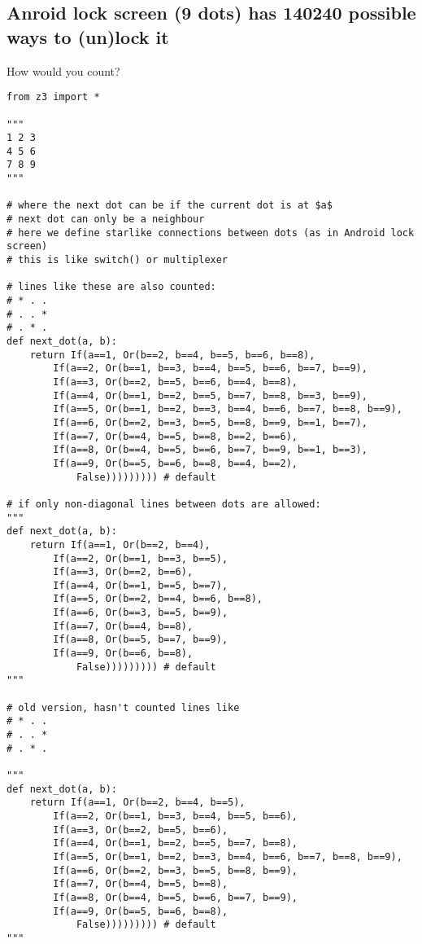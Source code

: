 \subsection{Anroid lock screen (9 dots) has 140240 possible ways to (un)lock it}

How would you count?

\begin{lstlisting}
from z3 import *

"""
1 2 3
4 5 6
7 8 9
"""

# where the next dot can be if the current dot is at $a$
# next dot can only be a neighbour
# here we define starlike connections between dots (as in Android lock screen)
# this is like switch() or multiplexer

# lines like these are also counted:
# * . .
# . . *
# . * .
def next_dot(a, b):
    return If(a==1, Or(b==2, b==4, b==5, b==6, b==8),
        If(a==2, Or(b==1, b==3, b==4, b==5, b==6, b==7, b==9),
        If(a==3, Or(b==2, b==5, b==6, b==4, b==8),
        If(a==4, Or(b==1, b==2, b==5, b==7, b==8, b==3, b==9),
        If(a==5, Or(b==1, b==2, b==3, b==4, b==6, b==7, b==8, b==9),
        If(a==6, Or(b==2, b==3, b==5, b==8, b==9, b==1, b==7),
        If(a==7, Or(b==4, b==5, b==8, b==2, b==6),
        If(a==8, Or(b==4, b==5, b==6, b==7, b==9, b==1, b==3),
        If(a==9, Or(b==5, b==6, b==8, b==4, b==2),
            False))))))))) # default

# if only non-diagonal lines between dots are allowed:
"""
def next_dot(a, b):
    return If(a==1, Or(b==2, b==4),
        If(a==2, Or(b==1, b==3, b==5),
        If(a==3, Or(b==2, b==6),
        If(a==4, Or(b==1, b==5, b==7),
        If(a==5, Or(b==2, b==4, b==6, b==8),
        If(a==6, Or(b==3, b==5, b==9),
        If(a==7, Or(b==4, b==8),
        If(a==8, Or(b==5, b==7, b==9),
        If(a==9, Or(b==6, b==8),
            False))))))))) # default
"""

# old version, hasn't counted lines like
# * . .
# . . *
# . * .

"""
def next_dot(a, b):
    return If(a==1, Or(b==2, b==4, b==5),
        If(a==2, Or(b==1, b==3, b==4, b==5, b==6),
        If(a==3, Or(b==2, b==5, b==6),
        If(a==4, Or(b==1, b==2, b==5, b==7, b==8),
        If(a==5, Or(b==1, b==2, b==3, b==4, b==6, b==7, b==8, b==9),
        If(a==6, Or(b==2, b==3, b==5, b==8, b==9),
        If(a==7, Or(b==4, b==5, b==8),
        If(a==8, Or(b==4, b==5, b==6, b==7, b==9),
        If(a==9, Or(b==5, b==6, b==8),
            False))))))))) # default
"""


\end{lstlisting}
